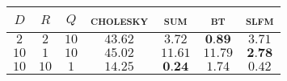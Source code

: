 
\begin{tabular}{ccccccc}
  \toprule

  $D$ & $R$ & $Q$ & \textsc{cholesky} & \textsc{sum} & \textsc{bt} & \textsc{slfm}\\\midrule
 $ 2 $ & $ 2 $ & $ 10 $ & $ 43.62 $ & $ 3.72 $ & $ \textbf{0.89} $ & $ 3.71 $ \\ 
 $ 10 $ & $ 1 $ & $ 10 $ & $ 45.02 $ & $ 11.61 $ & $ 11.79 $ & $ \textbf{2.78} $ \\ 
 $ 10 $ & $ 10 $ & $ 1 $ & $ 14.25 $ & $ \textbf{0.24} $ & $ 1.74 $ & $ 0.42 $ \\ 
 \bottomrule 
 \end{tabular}